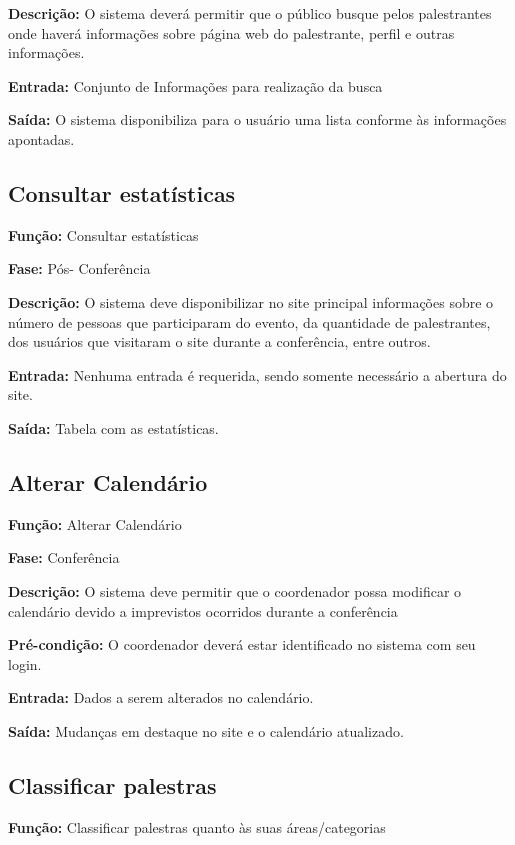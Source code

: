 \documentclass[letter]{article}
\begin{document}
\textbf{Descrição:}  O sistema deverá permitir que o público busque pelos palestrantes onde haverá informações sobre página web do palestrante, perfil e outras informações.

\textbf{Entrada:}  Conjunto de Informações para realização da busca

\textbf{Saída:}  O sistema disponibiliza para o usuário uma lista conforme às informações apontadas.


\subsection{Consultar estatísticas}

\textbf{Função:}  Consultar estatísticas

\textbf{Fase:}  Pós- Conferência

\textbf{Descrição:}  O sistema deve disponibilizar no site principal informações sobre o número de pessoas que participaram do evento, da quantidade de palestrantes, dos usuários que visitaram o site durante a conferência, entre outros.

\textbf{Entrada:}  Nenhuma entrada é requerida, sendo somente necessário a abertura do site.

\textbf{Saída:}  Tabela com as estatísticas.
 

\subsection{Alterar Calendário}

\textbf{Função:} Alterar Calendário

\textbf{Fase:}  Conferência

\textbf{Descrição:}  O sistema deve permitir que o coordenador possa modificar o calendário devido a imprevistos ocorridos durante a conferência

\textbf{Pré-condição:}  O coordenador deverá estar identificado no sistema com seu login.

\textbf{Entrada:} Dados a serem alterados no calendário.

\textbf{Saída:}  Mudanças em destaque no site e o calendário atualizado.



\subsection{Classificar palestras}

\textbf{Função:} Classificar palestras quanto às suas áreas/categorias
\end{document}
